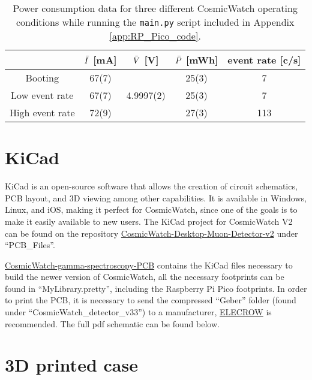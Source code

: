 \begin{table}[H]
  \caption{Power consumption data for three different CosmicWatch operating conditions while running the \texttt{main.py} script included in Appendix \ref{app:RP_Pico_code}.}
  \centering
  \begin{tabular}{ c c c c c }
    \midrule
     & $\Bar{I}$ [mA] & $\Bar{V}$ [V] & $\Bar{P}$ [mWh] & event rate [c/s] \\
    \midrule
    Booting & 67(7) & \multirow{3}{*}{4.9997(2)} & 25(3) & 7 \\
    Low event rate & 67(7) & & 25(3) & 7 \\
    High event rate & 72(9) & & 27(3) & 113 \\
    \bottomrule
  \end{tabular}
  \label{tab:Power_consumption}
\end{table}

\section{KiCad}

KiCad is an open-source software that allows the creation of circuit schematics, PCB layout, and 3D viewing among other capabilities. It is available in Windows, Linux, and iOS, making it perfect for CosmicWatch, since one of the goals is to make it easily available to new users. The KiCad project for CosmicWatch V2 can be found on the repository \href{https://github.com/spenceraxani/CosmicWatch-Desktop-Muon-Detector-v2}{CosmicWatch-Desktop-Muon-Detector-v2} under ``PCB\_Files''.

\href{https://github.com/anvargasl/CosmicWatch-gamma-spectroscopy-PCB}{CosmicWatch-gamma-spectroscopy-PCB} contains the KiCad files necessary to build the newer version of CosmicWatch, all the necessary footprints can be found in ``MyLibrary.pretty'', including the Raspberry Pi Pico footprints. In order to print the PCB, it is necessary to send the compressed ``Geber'' folder (found under ``CosmicWatch\_detector\_v33'') to a manufacturer, \href{https://www.elecrow.com/pcb-manufacturing.html}{ELECROW} is recommended. The full pdf schematic can be found below.



\section{3D printed case}

